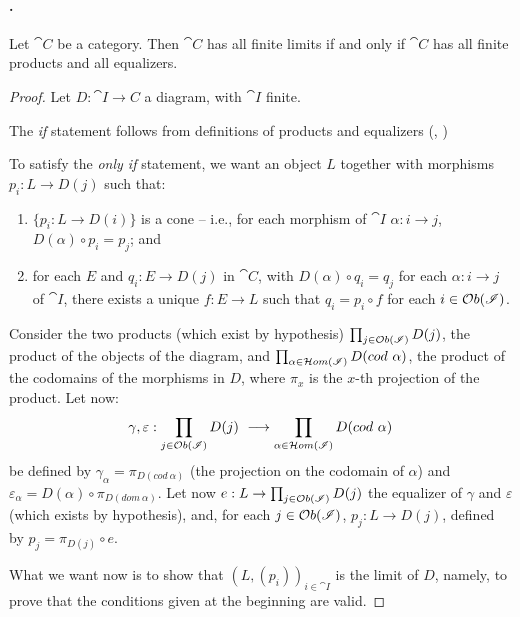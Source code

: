 \paragraph{.}
 Let $\cat C$ be a category. Then $\cat C$ has all finite limits if and only if $\cat C$ has all finite products and all equalizers.
\begin{proof}
    Let $D: \cat{I \rightarrow C}$ a diagram, with $\cat I$ finite.
    
    The \emph{if} statement follows from definitions of products and equalizers (, )

    To satisfy the \emph{only if} statement, we want an object $L$ together with morphisms $p_i : L \rightarrow D(j)$ such that:
    \begin{enumerate}
        \item\label{item:cone} $\{p_i: L \rightarrow D(i)\}$ is a cone -- i.e., for each morphism of $\cat I$ $\alpha : i \rightarrow j$, $D(\alpha) \circ p_i = p_j$; and
        \item\label{item:univ_prop} for each $E$ and $q_i : E \rightarrow D(j)$ in $\cat C$, with $D(\alpha) \circ q_i = q_j$ for each $\alpha : i \rightarrow j$ of $\cat I$, there exists a unique $f: E \rightarrow L$ such that $q_i = p_i \circ f$ for each $i \in \mathcal{O}b(\mathscr{I})$.
    \end{enumerate}

    Consider the two products (which exist by hypothesis) $\prod_{j \in \mathcal{O}b(\mathscr{I})} D(j)$, the product of the objects of the diagram, and $\prod_{\alpha \in \Hom(\cat I)}D(cod \ \alpha)$, the product of the codomains of the morphisms in $D$, where $\pi_x$ is the $x$-th projection of the product.
    Let now:
    \[
        \gamma, \varepsilon : \prod_{j \in \mathcal{O}b(\mathscr{I})}D(j) \ \longrightarrow \prod_{\alpha \in \mathcal{H}om(\mathscr{I})} D(cod \ \alpha)
    \]
    be defined by $\gamma_\alpha = \pi_{D(cod\ \alpha)}$ (the projection on the codomain of $\alpha$) and $\varepsilon_\alpha = D(\alpha) \circ \pi_{D(dom \ \alpha)}$.
    Let now $e: L \rightarrow \prod_{j \in \mathcal{O}b(\mathscr{I})}D(j)$ the equalizer of $\gamma$ and $\varepsilon$ (which exists by hypothesis), and, for each $j \in \mathcal{O}b(\mathscr{I})$, $p_j: L \rightarrow D(j)$, defined by $p_j = \pi_{D(j)} \circ e$.
    
    What we want now is to show that $(L, (p_i))_{i \in \cat I}$ is the limit of $D$, namely, to prove that the conditions given at the beginning are valid.


\end{proof}
